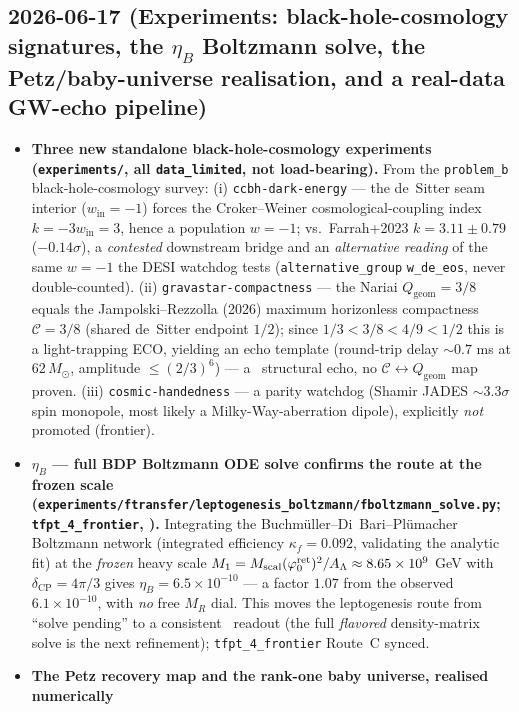 \documentclass[11pt]{article}
\begin{document}
\subsection*{2026-06-17 (Experiments: black-hole-cosmology signatures, the $\eta_B$ Boltzmann solve, the Petz/baby-universe realisation, and a real-data GW-echo pipeline)}
\begin{itemize}
\item \textbf{Three new standalone black-hole-cosmology experiments (\texttt{experiments/}, all
  \texttt{data\_limited}, not load-bearing).} From the \texttt{problem\_b} black-hole-cosmology survey:
  (i) \texttt{ccbh-dark-energy} --- the de~Sitter seam interior ($w_{\mathrm{in}}{=}{-}1$) forces the
  Croker--Weiner cosmological-coupling index $k={-}3w_{\mathrm{in}}=3$, hence a population $w={-}1$;
  vs.\ Farrah+2023 $k=3.11\pm0.79$ ($-0.14\sigma$), a \emph{contested} downstream bridge and an
  \emph{alternative reading} of the same $w={-}1$ the DESI watchdog tests (\texttt{alternative\_group}
  \texttt{w\_de\_eos}, never double-counted). (ii) \texttt{gravastar-compactness} --- the Nariai
  $Q_{\mathrm{geom}}{=}3/8$ equals the Jampolski--Rezzolla (2026) maximum horizonless compactness
  $\mathcal C{=}3/8$ (shared de~Sitter endpoint $1/2$); since $1/3{<}3/8{<}4/9{<}1/2$ this is a
  light-trapping ECO, yielding an echo template (round-trip delay ${\sim}0.7$ ms at $62\,M_\odot$,
  amplitude $\le(2/3)^6$) --- a \mC\ structural echo, no $\mathcal C\!\leftrightarrow\!Q_{\mathrm{geom}}$
  map proven. (iii) \texttt{cosmic-handedness} --- a parity watchdog (Shamir JADES ${\sim}3.3\sigma$
  spin monopole, most likely a Milky-Way-aberration dipole), explicitly \emph{not} promoted (frontier).
\item \textbf{$\eta_B$ --- full BDP Boltzmann ODE solve confirms the route at the frozen scale
  (\texttt{experiments/ftransfer/leptogenesis\_boltzmann/fboltzmann\_solve.py}; \texttt{tfpt\_4\_frontier},
  \mC).} Integrating the Buchm\"uller--Di~Bari--Pl\"umacher Boltzmann network (integrated efficiency
  $\kappa_f=0.092$, validating the analytic fit) at the \emph{frozen} heavy scale
  $M_1=M_{\mathrm{scal}}(\varphi_0^{\mathrm{ret}})^2/A_\Lambda\approx8.65\times10^9$ GeV with $\delta_{\mathrm{CP}}=4\pi/3$ gives
  $\eta_B=6.5\times10^{-10}$ --- a factor $1.07$ from the observed $6.1\times10^{-10}$, with \emph{no} free
  $M_R$ dial. This moves the leptogenesis route from ``solve pending'' to a consistent \mC\ readout (the full
  \emph{flavored} density-matrix solve is the next refinement); \texttt{tfpt\_4\_frontier} Route~C synced.
\item \textbf{The Petz recovery map and the rank-one baby universe, realised numerically
}
\end{itemize}
\end{document}
